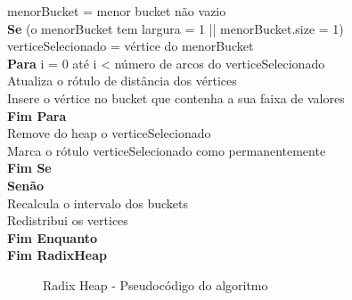 {\begin{minipage}{70ex}
\vspace*{-1mm} \phantom{} \hspace{6ex} menorBucket = menor bucket não vazio\\
\vspace*{-1mm} \phantom{} \hspace{6ex} {\bf Se} (o menorBucket tem largura = 1 || menorBucket.size = 1)\\
\vspace*{-1mm} \phantom{} \hspace{9ex} verticeSelecionado = vértice do menorBucket\\
\vspace*{-1mm} \phantom{} \hspace{9ex} {\bf Para} i = 0 até i < número de arcos do verticeSelecionado\\
\vspace*{-1mm} \phantom{} \hspace{12ex} Atualiza o rótulo de distância dos vértices\\
\vspace*{-1mm} \phantom{} \hspace{12ex} Insere o vértice no bucket que contenha a sua faixa de valores\\
\vspace*{-1mm} \phantom{} \hspace{9ex} {\bf Fim Para}\\
\vspace*{-1mm} \phantom{} \hspace{9ex} Remove do heap o verticeSelecionado\\
\vspace*{-1mm} \phantom{} \hspace{9ex} Marca o rótulo verticeSelecionado como permanentemente\\
\vspace*{-1mm} \phantom{} \hspace{6ex} {\bf Fim Se}\\
\vspace*{-1mm} \phantom{} \hspace{6ex} {\bf Senão}\\
\vspace*{-1mm} \phantom{} \hspace{9ex} Recalcula o intervalo dos buckets\\
\vspace*{-1mm} \phantom{} \hspace{9ex} Redistribui os vertices\\
\vspace*{-1mm} \phantom{} \hspace{3ex} {\bf Fim Enquanto}\\
\vspace*{-1mm} \phantom{} \hspace{0ex} {\bf Fim RadixHeap}\\
\end{minipage}}
\begin{figure}[htbp]
\centering
\caption{Radix Heap - Pseudocódigo do algoritmo}
\label{fig:codeRadix}
\end{figure}
\FloatBarrier

